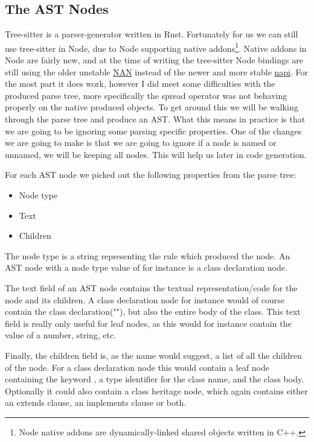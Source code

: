 
\subsection{The AST Nodes}\label{subsec:the-ast-nodes}

Tree-sitter is a parser-generator written in Rust.
Fortunately for us we can still use tree-sitter in Node, due to Node supporting native addons\footnote{Node native addons are dynamically-linked shared objects written in C++\cite{nodenativeaddons}.}.
Native addons in Node are fairly new, and at the time of writing the tree-sitter Node bindings are still using the older unstable \hyperref[https://github.com/nodejs/nan]{NAN} instead of the newer and more stable \hyperref[https://nodejs.org/api/n-api.html]{napi}.
For the most part it does work, however I did meet some difficulties with the produced parse tree, more specifically the spread operator was not behaving properly on the native produced objects.
To get around this we will be walking through the parse tree and produce an AST.
What this means in practice is that we are going to be ignoring some parsing specific properties.
One of the changes we are going to make is that we are going to ignore if a node is named or unnamed, we will be keeping all nodes.
This will help us later in code generation.

For each AST node we picked out the following properties from the parse tree:

\begin{itemize}
    \item Node type
    \item Text
    \item Children
\end{itemize}

The node type is a string representing the rule which produced the node.
An AST node with a node type value of  for instance is a class declaration node.

The text field of an AST node contains the textual representation/code for the node and its children.
A class declaration node for instance would of course contain the class declaration(""), but also the entire body of the class.
This text field is really only useful for leaf nodes, as this would for instance contain the value of a number, string, etc.

Finally, the children field is, as the name would suggest, a list of all the children of the node.
For a class declaration node this would contain a leaf node containing the keyword , a type identifier for the class name, and the class body.
Optionally it could also contain a class heritage node, which again contains either an extends clause, an implements clause or both.

